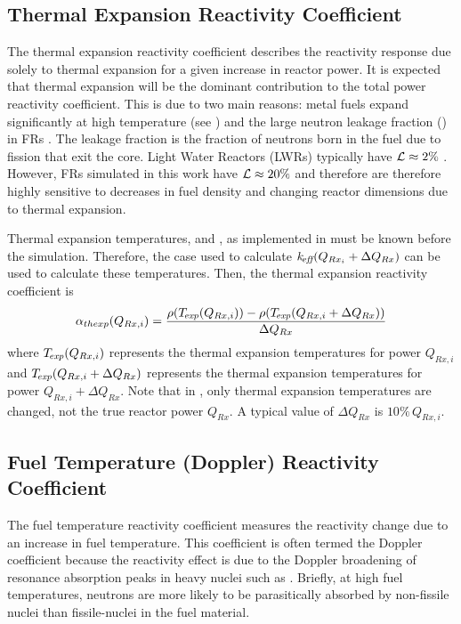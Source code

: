   \subsection{Thermal Expansion Reactivity Coefficient}
  \label{sec:thermal_expansion_reactivity_coefficent}
    The thermal expansion reactivity coefficient describes the reactivity 
    response due solely to thermal expansion for a given increase in reactor 
    power. It is expected that thermal expansion will be the dominant 
    contribution to the total power reactivity coefficient. This is due to two 
    main reasons: metal fuels expand significantly at high temperature (see 
    ) and the large neutron leakage fraction 
    (\leakage) in FRs \cite{PlentifulEnergy}. The leakage fraction is the 
    fraction of neutrons born in the fuel due to fission that exit the core. 
    Light Water Reactors (LWRs) typically have $\mathcal{L} \approx 2 \%$ 
    \cite{textbookknief}. However, FRs simulated in this work have 
    $\mathcal{L} \approx 20\%$ and therefore are therefore highly sensitive to 
    decreases in fuel density and changing reactor dimensions due to thermal 
    expansion.

    Thermal expansion temperatures, \texpfuel and \texpstruct, as implemented in 
     must be known before the simulation. Therefore,
    the case used to calculate $k_{\!\mbox{\scriptsize \em eff}}(Q_{Rx_i} + \Delta Q_{Rx})$ can be used to
    calculate these temperatures. Then, the thermal expansion reactivity
    coefficient is 
    \begin{equation}
      \label{eq:thermal_expansion_reactivity_coefficient}
      \alpha_{thexp}(Q_{Rx,i}) = \frac{\rho({T_{\!\mbox{\scriptsize \em exp}}}(Q_{Rx,i})) - 
        \rho({T_{\!\mbox{\scriptsize \em exp}}}(Q_{Rx,i} + \Delta Q_{Rx}))}
        {\Delta Q_{Rx}}
    \end{equation}
    where ${T_{\!\mbox{\scriptsize \em exp}}}(Q_{Rx,i})$ represents the thermal expansion temperatures for
    power $Q_{Rx,i}$ and ${T_{\!\mbox{\scriptsize \em exp}}}(Q_{Rx,i} + \Delta Q_{Rx})$ represents the
    thermal expansion temperatures for power $Q_{Rx,i} + \Delta Q_{Rx}$. Note
    that in , only thermal
    expansion temperatures are changed, not the true reactor power $Q_{Rx}$.
    A typical value of $\Delta Q_{Rx}$ is $10\% \, Q_{Rx,i}$.

  \subsection{Fuel Temperature (Doppler) Reactivity Coefficient}
  \label{sec:fuel_temperature_reactivity_coefficient}
    The fuel temperature reactivity coefficient measures the reactivity change due
    to an increase in fuel temperature. This coefficient is often termed the
    Doppler coefficient because the reactivity effect is due to the Doppler
    broadening of resonance absorption peaks in heavy nuclei such as
     \cite{textbookknief}. Briefly, at high fuel temperatures, 
    neutrons are more likely to be parasitically absorbed by non-fissile nuclei
    than fissile-nuclei in the fuel material.

